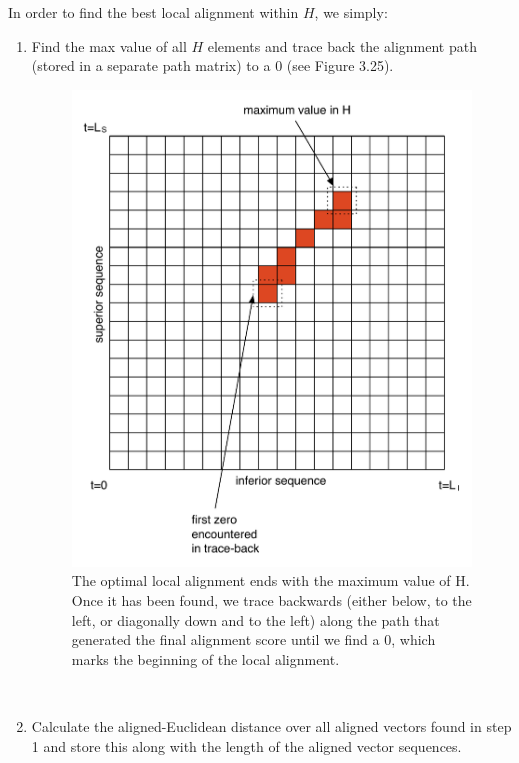 \documentclass[a4paper,12pt]{report} 	%
\numberwithin{figure}{chapter}
\numberwithin{table}{chapter}
\numberwithin{equation}{chapter}
\begin{document}
\begin{flushleft}
In order to find the best local alignment within $H$, we simply:
\begin{enumerate}
\item Find the max value of all $H$ elements and trace back the alignment path (stored in a separate path matrix) to a $0$ (see Figure 3.25).
\begin{figure}[h!]
\begin{center}
\includegraphics[scale=0.75]{SIC-DPLA_1}
\caption[Finding Optimal Subsequence]{The optimal local alignment ends with the maximum value of H. Once it has been found, we trace backwards (either below, to the left, or diagonally down and to the left) along the path that generated the final alignment score until we find a $0$, which marks the beginning of the local alignment.}
\end{center}
\end{figure}
\\
\item Calculate the aligned-Euclidean distance over all aligned vectors found in step 1 and store this along with the length of the aligned vector sequences.
\end{enumerate}

\end{flushleft}
\end{document}
